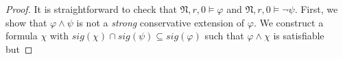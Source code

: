 \documentclass{lmcs} %
\theoremstyle{plain}\newtheorem{satz}[thm]{Satz} %
\newcommand{\sig}{\mathit{sig}}
\newcommand{\tiling}{\mathfrak T}
\newcommand{\fform}[1]{\boldsymbol{#1}}
\newcommand{\gvar}{\fform{g}}
\newcommand{\tvar}{\fform{t}}
\newcommand{\xvar}{\fform{x}}
\newcommand{\yvar}{\fform{y}}
\begin{document}
\begin{proof}
		It is straightforward to check that $\mathfrak{N},r,0\models \varphi$ and $\mathfrak{N},r,0\models \neg\psi$.
		First, we show that $\varphi \wedge \psi$ is not a 
		\emph{strong} conservative extension of $\varphi$.
		We construct a formula $\chi$ with $\sig(\chi) \cap \sig(\psi)\subseteq \sig(\varphi)$ such that $\varphi \wedge \chi$ is satisfiable but 

\end{proof}
\end{document}
